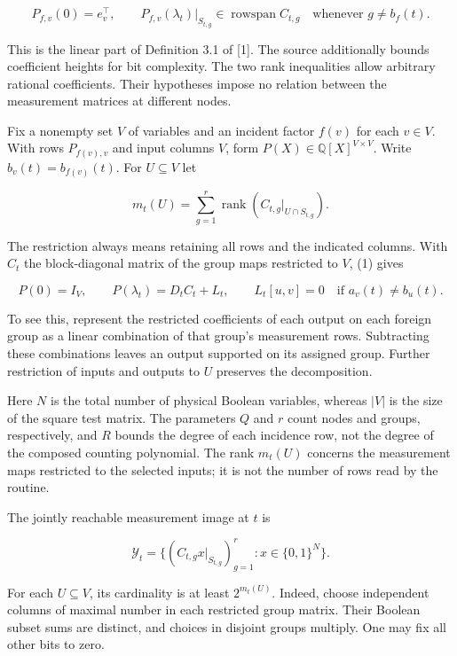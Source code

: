 \documentclass[
  10pt,
]{article}
\begin{document}
\[
 P_{f,v}(0)=e_v^\top,\qquad
 P_{f,v}(\lambda_t)|_{S_{t,g}}\in\operatorname{rowspan}C_{t,g}
             \quad\text{whenever } g\ne b_f(t).                       \tag{1}
\]

This is the linear part of Definition 3.1 of {[}1{]}. The source
additionally bounds coefficient heights for bit complexity. The two rank
inequalities allow arbitrary rational coefficients. Their hypotheses
impose no relation between the measurement matrices at different nodes.

Fix a nonempty set \(V\) of variables and an incident factor \(f(v)\)
for each \(v\in V\). With rows \(P_{f(v),v}\) and input columns \(V\),
form \(P(X)\in\mathbb Q[X]^{V\times V}\). Write \(b_v(t)=b_{f(v)}(t)\).
For \(U\subseteq V\) let

\[
 m_t(U)=\sum_{g=1}^{r}\operatorname{rank}\!\left(
                  C_{t,g}|_{U\cap S_{t,g}}\right).
\]

The restriction always means retaining all rows and the indicated
columns. With \(C_t\) the block-diagonal matrix of the group maps
restricted to \(V\), (1) gives

\[
 P(0)=I_V,\qquad P(\lambda_t)=D_t C_t+L_t,\qquad
 L_t[u,v]=0\quad\text{if }a_v(t)\ne b_u(t).                          \tag{2}
\]

To see this, represent the restricted coefficients of each output on
each foreign group as a linear combination of that group's measurement
rows. Subtracting these combinations leaves an output supported on its
assigned group. Further restriction of inputs and outputs to \(U\)
preserves the decomposition.

Here \(N\) is the total number of physical Boolean variables, whereas
\(|V|\) is the size of the square test matrix. The parameters \(Q\) and
\(r\) count nodes and groups, respectively, and \(R\) bounds the degree
of each incidence row, not the degree of the composed counting
polynomial. The rank \(m_t(U)\) concerns the measurement maps restricted
to the selected inputs; it is not the number of rows read by the
routine.

The jointly reachable measurement image at \(t\) is

\[
  \mathcal Y_t=\{(C_{t,g}x|_{S_{t,g}})_{g=1}^{r}:x\in\{0,1\}^N\}.
\]

For each \(U\subseteq V\), its cardinality is at least \(2^{m_t(U)}\).
Indeed, choose independent columns of maximal number in each restricted
group matrix. Their Boolean subset sums are distinct, and choices in
disjoint groups multiply. One may fix all other bits to zero.
\end{document}
